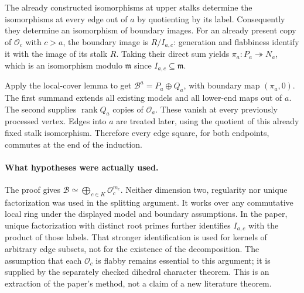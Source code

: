 The already constructed isomorphisms at upper stalks determine the
isomorphisms at every edge out of $a$ by quotienting by its label.
Consequently they determine an isomorphism of boundary images.
For an already present copy of $\mathcal O_c$ with $c>a$, the boundary
image is $R/I_{a,c}$: generation and flabbiness identify it with the
image of its stalk $R$.
Taking their direct sum yields $\pi_a:P_a\twoheadrightarrow N_a$,
which is an isomorphism modulo $\mathfrak m$ since
$I_{a,c}\subseteq\mathfrak m$.

Apply the local-cover lemma to get
$\mathcal B^a=P_a\oplus Q_a$, with boundary map $(\pi_a,0)$.
The first summand extends all existing models and all lower-end maps
out of $a$.  The second supplies $\operatorname{rank}Q_a$ copies of
$\mathcal O_a$.  These vanish at every previously processed vertex.
Edges into $a$ are treated later, using the quotient of this already
fixed stalk isomorphism.  Therefore every edge square, for both
endpoints, commutes at the end of the induction.

\paragraph{What hypotheses were actually used.}
The proof gives
$\mathcal B\simeq\bigoplus_{c\in K}\mathcal O_c^{m_c}$.
Neither dimension two, regularity nor unique factorization was used
in the splitting argument.  It works over any commutative local ring
under the displayed model and boundary assumptions.
In the paper, unique factorization with distinct root primes further
identifies $I_{a,c}$ with the product of those labels.  That stronger
identification is used for kernels of arbitrary edge subsets, not
for the existence of the decomposition.
The assumption that each $\mathcal O_c$ is flabby remains essential to
this argument; it is supplied by the separately checked dihedral
character theorem.  This is an extraction of the paper's method,
not a claim of a new literature theorem.
